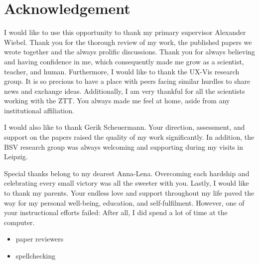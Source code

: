 %
\chapter*{Acknowledgement}
\label{sec:acknowledgement}
\vspace*{-10mm}

I would like to use this opportunity to thank my primary supervisor Alexander Wiebel. Thank you for the thorough review of my work, the published papers we wrote together and the always prolific discussions. Thank you for always believing and having confidence in me, which consequently made me grow as a scientist, teacher, and human. Furthermore, I would like to thank the UX-Vis research group. It is so precious to have a place with peers facing similar hurdles to share news and exchange ideas. Additionally, I am very thankful for all the scientists working with the ZTT. You always made me feel at home, aside from any institutional affiliation.

I would also like to thank Gerik Scheuermann. Your direction, assessment, and support on the papers raised the quality of my work significantly. In addition, the BSV research group was always welcoming and supporting during my visits in Leipzig.

Special thanks belong to my dearest Anna-Lena. Overcoming each hardship and celebrating every small victory was all the sweeter with you. Lastly, I would like to thank my parents. Your endless love and support throughout my life paved the way for my personal well-being, education, and self-fulfilment. However, one of your instructional efforts failed: After all, I did spend a lot of time at the computer.

\begin{itemize}
    \item paper reviewers
    \item spellchecking
\end{itemize}
